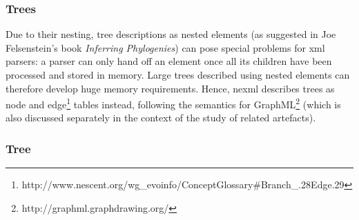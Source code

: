 \documentclass{article}
\begin{document}
\subsubsection{Trees}

Due to their nesting, tree descriptions as nested elements (as suggested in Joe Felsenstein's book \textit{Inferring Phylogenies}) 
can pose special problems for xml parsers: a parser can only hand off an element once all its children have been processed and stored 
in memory. Large trees described using nested elements can therefore develop huge memory requirements. Hence, nexml describes trees as 
node and edge\footnote{http://www.nescent.org/wg\_evoinfo/ConceptGlossary\#Branch\_.28Edge.29} tables instead, following the semantics 
for GraphML\footnote{http://graphml.graphdrawing.org/} (which is also discussed separately in the context of the study of related artefacts).
\subsubsection{Tree}
\end{document}
